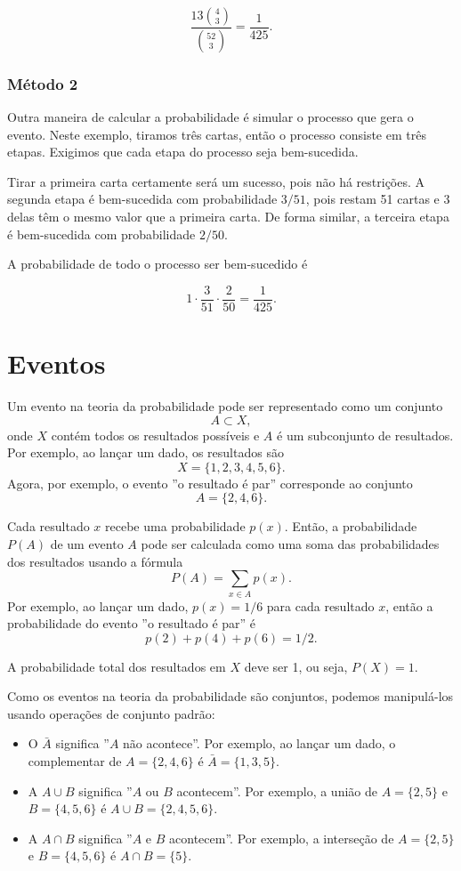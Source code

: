 \[\frac{13 {4 \choose 3}}{{52 \choose 3}} = \frac{1}{425}.\]

\subsubsection*{Método 2}

Outra maneira de calcular a probabilidade é
simular o processo que gera o evento.
Neste exemplo, tiramos três cartas, então o processo
consiste em três etapas.
Exigimos que cada etapa do processo seja bem-sucedida.

Tirar a primeira carta certamente será um sucesso,
pois não há restrições.
A segunda etapa é bem-sucedida com probabilidade $3/51$,
pois restam 51 cartas e 3 delas
têm o mesmo valor que a primeira carta.
De forma similar, a terceira etapa é bem-sucedida com probabilidade $2/50$.

A probabilidade de todo o processo ser bem-sucedido é

\[1 \cdot \frac{3}{51} \cdot \frac{2}{50} = \frac{1}{425}.\]

\section{Eventos}

Um evento na teoria da probabilidade pode ser representado como um conjunto
\[A \subset X,\]
onde $X$ contém todos os resultados possíveis
e $A$ é um subconjunto de resultados.
Por exemplo, ao lançar um dado, os resultados são
\[X = \{1,2,3,4,5,6\}.\]
Agora, por exemplo, o evento ''o resultado é par''
corresponde ao conjunto
\[A = \{2,4,6\}.\]

Cada resultado $x$ recebe uma probabilidade $p(x)$.
Então, a probabilidade $P(A)$ de um evento
$A$ pode ser calculada como uma soma
das probabilidades dos resultados usando a fórmula
\[P(A) = \sum_{x \in A} p(x).\]
Por exemplo, ao lançar um dado,
$p(x)=1/6$ para cada resultado $x$,
então a probabilidade do evento
''o resultado é par'' é
\[p(2)+p(4)+p(6)=1/2.\]

A probabilidade total dos resultados em $X$ deve
ser 1, ou seja, $P(X)=1$.

Como os eventos na teoria da probabilidade são conjuntos,
podemos manipulá-los usando operações de conjunto padrão:

\begin{itemize}
\item O  $\bar A$ significa
''$A$ não acontece''.
Por exemplo, ao lançar um dado,
o complementar de $A=\{2,4,6\}$ é
$\bar A = \{1,3,5\}$.
\item A  $A \cup B$ significa
''$A$ ou $B$ acontecem''.
Por exemplo, a união de
$A=\{2,5\}$
e $B=\{4,5,6\}$ é
$A \cup B = \{2,4,5,6\}$.
\item A  $A \cap B$ significa
''$A$ e $B$ acontecem''.
Por exemplo, a interseção de
$A=\{2,5\}$ e $B=\{4,5,6\}$ é
$A \cap B = \{5\}$.
\end{itemize}

